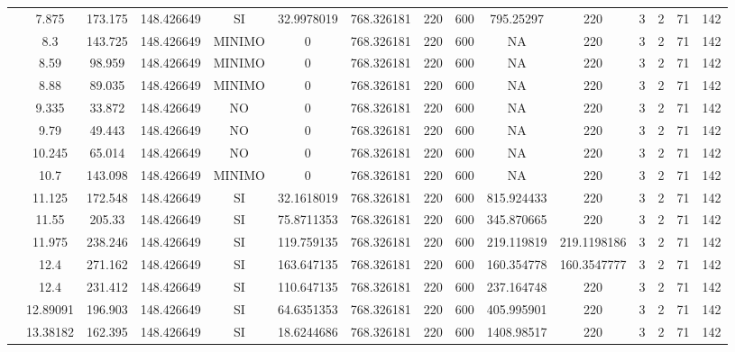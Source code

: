 \begin{table}[H]
{\begin{tabular}{|c|c|c|c|c|c|c|c|c|c|c|c|c|c|c|}
\cline{2-15}    & 7.875 & 173.175 & 148.426649 & SI  & 32.9978019 & 768.326181 & 220 & 600 & 795.25297 & 220 & 3   & 2   & 71  & 142 \bigstrut\\
\cline{2-15}    & 8.3 & 143.725 & 148.426649 & MINIMO & 0   & 768.326181 & 220 & 600 & NA  & 220 & 3   & 2   & 71  & 142 \bigstrut\\
\cline{2-15}    & 8.59 & 98.959 & 148.426649 & MINIMO & 0   & 768.326181 & 220 & 600 & NA  & 220 & 3   & 2   & 71  & 142 \bigstrut\\
\cline{2-15}    & 8.88 & 89.035 & 148.426649 & MINIMO & 0   & 768.326181 & 220 & 600 & NA  & 220 & 3   & 2   & 71  & 142 \bigstrut\\
\cline{2-15}    & 9.335 & 33.872 & 148.426649 & NO  & 0   & 768.326181 & 220 & 600 & NA  & 220 & 3   & 2   & 71  & 142 \bigstrut\\
\cline{2-15}    & 9.79 & 49.443 & 148.426649 & NO  & 0   & 768.326181 & 220 & 600 & NA  & 220 & 3   & 2   & 71  & 142 \bigstrut\\
\cline{2-15}    & 10.245 & 65.014 & 148.426649 & NO  & 0   & 768.326181 & 220 & 600 & NA  & 220 & 3   & 2   & 71  & 142 \bigstrut\\
\cline{2-15}    & 10.7 & 143.098 & 148.426649 & MINIMO & 0   & 768.326181 & 220 & 600 & NA  & 220 & 3   & 2   & 71  & 142 \bigstrut\\
\cline{2-15}    & 11.125 & 172.548 & 148.426649 & SI  & 32.1618019 & 768.326181 & 220 & 600 & 815.924433 & 220 & 3   & 2   & 71  & 142 \bigstrut\\
\cline{2-15}    & 11.55 & 205.33 & 148.426649 & SI  & 75.8711353 & 768.326181 & 220 & 600 & 345.870665 & 220 & 3   & 2   & 71  & 142 \bigstrut\\
\cline{2-15}    & 11.975 & 238.246 & 148.426649 & SI  & 119.759135 & 768.326181 & 220 & 600 & 219.119819 & 219.1198186 & 3   & 2   & 71  & 142 \bigstrut\\
\cline{2-15}    & 12.4 & 271.162 & 148.426649 & SI  & 163.647135 & 768.326181 & 220 & 600 & 160.354778 & 160.3547777 & 3   & 2   & 71  & 142 \bigstrut\\
\cline{2-15}    & 12.4 & 231.412 & 148.426649 & SI  & 110.647135 & 768.326181 & 220 & 600 & 237.164748 & 220 & 3   & 2   & 71  & 142 \bigstrut\\
\cline{2-15}    & 12.89091 & 196.903 & 148.426649 & SI  & 64.6351353 & 768.326181 & 220 & 600 & 405.995901 & 220 & 3   & 2   & 71  & 142 \bigstrut\\
\cline{2-15}    & 13.38182 & 162.395 & 148.426649 & SI  & 18.6244686 & 768.326181 & 220 & 600 & 1408.98517 & 220 & 3   & 2   & 71  & 142 \bigstrut\\

\end{tabular}}
\end{table}
